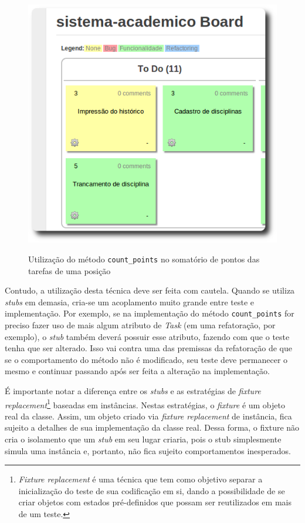 \begin{figure}[h]
  \center
  \caption{Utilização do método \texttt{count\_points} no somatório de pontos das tarefas de uma posição}
  \includegraphics[scale=0.5]{images/count-points}
  \label{img:count-points}
\end{figure}

Contudo, a utilização desta técnica deve ser feita com cautela. Quando se utiliza \textit{stubs} em demasia, cria-se um acoplamento muito grande entre teste e implementação. Por exemplo, se na implementação do método \texttt{count\_points} for preciso fazer uso de mais algum atributo de \textit{Task} (em uma refatoração, por exemplo), o \textit{stub} também deverá possuir esse atributo, fazendo com que o teste tenha que ser alterado. Isso vai contra uma das premissas da refatoração de que se o comportamento do método não é modificado, seu teste deve permanecer o mesmo e continuar passando após ser feita a alteração na implementação.

É importante notar a diferença entre os \textit{stubs} e as estratégias de \textit{fixture replacement}\footnote{\textit{Fixture replacement} é uma técnica que tem como objetivo separar a inicialização do teste de sua codificação em si, dando a possibilidade de se criar objetos com estados pré-definidos que possam ser reutilizados em mais de um teste.} baseadas em instâncias. Nestas estratégias, o \textit{fixture} é um objeto real da classe. Assim, um objeto criado via \textit{fixture replacement} de instância, fica sujeito a detalhes de sua implementação da classe real. Dessa forma, o {fixture} não cria o isolamento que um \textit{stub} em seu lugar criaria, pois o stub simplesmente simula uma instância e, portanto, não fica sujeito comportamentos inesperados.


